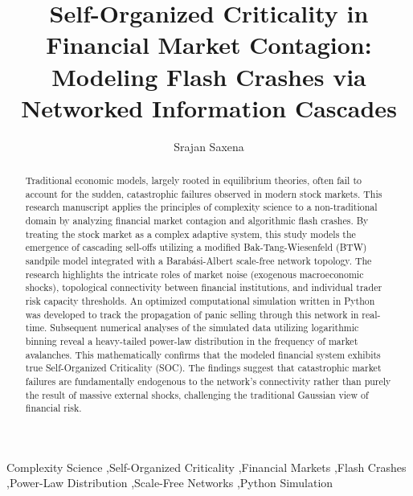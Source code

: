 \documentclass[final,5p,times,twocolumn,authoryear]{elsarticle}
\begin{document}
\begin{frontmatter}

\title{Self-Organized Criticality in Financial Market Contagion: Modeling Flash Crashes via Networked Information Cascades}

\author{Srajan Saxena}

\begin{abstract}
Traditional economic models, largely rooted in equilibrium theories, often fail to account for the sudden, catastrophic failures observed in modern stock markets. This research manuscript applies the principles of complexity science to a non-traditional domain by analyzing financial market contagion and algorithmic flash crashes. By treating the stock market as a complex adaptive system, this study models the emergence of cascading sell-offs utilizing a modified Bak-Tang-Wiesenfeld (BTW) sandpile model integrated with a Barabási-Albert scale-free network topology. The research highlights the intricate roles of market noise (exogenous macroeconomic shocks), topological connectivity between financial institutions, and individual trader risk capacity thresholds. An optimized computational simulation written in Python was developed to track the propagation of panic selling through this network in real-time. Subsequent numerical analyses of the simulated data utilizing logarithmic binning reveal a heavy-tailed power-law distribution in the frequency of market avalanches. This mathematically confirms that the modeled financial system exhibits true Self-Organized Criticality (SOC). The findings suggest that catastrophic market failures are fundamentally endogenous to the network's connectivity rather than purely the result of massive external shocks, challenging the traditional Gaussian view of financial risk.
\end{abstract}

\begin{keyword}
Complexity Science \sep Self-Organized Criticality \sep Financial Markets \sep Flash Crashes \sep Power-Law Distribution \sep Scale-Free Networks \sep Python Simulation
\end{keyword}

\end{frontmatter}
\end{document}
